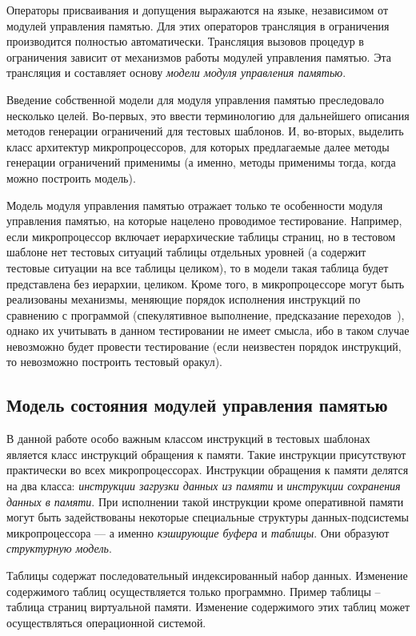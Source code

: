 Операторы присваивания и допущения выражаются на языке, независимом
от модулей управления памятью. Для этих операторов трансляция в
ограничения производится полностью автоматически. Трансляция вызовов
процедур в ограничения зависит от механизмов работы модулей
управления памятью. Эта трансляция и составляет основу \emph{модели
модуля управления памятью}.

Введение собственной модели для модуля управления памятью
преследовало несколько целей. Во-первых, это ввести терминологию для
дальнейшего описания методов генерации ограничений для тестовых
шаблонов. И, во-вторых, выделить класс архитектур микропроцессоров,
для которых предлагаемые далее методы генерации ограничений
применимы (а именно, методы применимы тогда, когда можно построить
модель).

Модель модуля управления памятью отражает только те особенности
модуля управления памятью, на которые нацелено проводимое
тестирование. Например, если микропроцессор включает иерархические
таблицы страниц, но в тестовом шаблоне нет тестовых ситуаций таблицы
отдельных уровней (а содержит тестовые ситуации на все таблицы
целиком), то в модели такая таблица будет представлена без иерархии,
целиком. Кроме того, в микропроцессоре могут быть реализованы
механизмы, меняющие порядок исполнения инструкций по сравнению с
программой (спекулятивное выполнение, предсказание
переходов~\cite{Pasko}), однако их учитывать в данном тестировании
не имеет смысла, ибо в таком случае невозможно будет провести
тестирование (если неизвестен порядок инструкций, то невозможно
построить тестовый оракул).

\subsection{Модель состояния модулей управления памятью}

В данной работе особо важным классом инструкций в тестовых шаблонах
является класс инструкций обращения к памяти. Такие инструкции
присутствуют практически во всех микропроцессорах. Инструкции
обращения к памяти делятся на два класса: \emph{инструкции загрузки
данных из памяти} и \emph{инструкции сохранения данных в памяти}.
При исполнении такой инструкции кроме оперативной памяти могут быть
задействованы некоторые специальные структуры данных-подсистемы
микропроцессора --- а именно \emph{кэширующие буфера} и
\emph{таблицы}. Они образуют \emph{структурную модель}.

Таблицы содержат последовательный индексированный набор данных.
Изменение содержимого таблиц осуществляется только программно.
Пример таблицы -- таблица страниц виртуальной памяти. Изменение
содержимого этих таблиц может осуществляться операционной системой.

